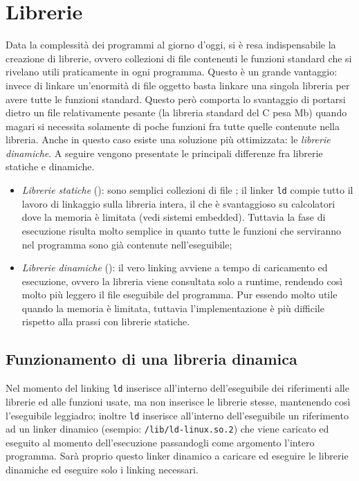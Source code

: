 \section{Librerie}
Data la complessità dei programmi al giorno d'oggi, si è resa indispensabile la creazione di librerie, ovvero collezioni di file  contenenti le funzioni standard che si rivelano utili praticamente in ogni programma.
Questo è un grande vantaggio: invece di linkare un'enormità di file oggetto basta linkare una singola libreria per avere tutte le funzioni standard. Questo però comporta lo svantaggio di portarsi dietro un file relativamente pesante (la libreria standard del C pesa \unit[2,5]{Mb}) quando magari si necessita solamente di poche funzioni fra tutte quelle contenute nella libreria. Anche in questo caso esiste una soluzione più ottimizzata: le \emph{librerie dinamiche}. A seguire vengono presentate le principali differenze fra librerie statiche e dinamiche.
\begin{itemize}
	\item \emph{Librerie statiche} (): sono semplici collezioni di file ; il linker \texttt{ld} compie tutto il lavoro di linkaggio sulla libreria intera, il che è svantaggioso su calcolatori dove la memoria è limitata (vedi sistemi embedded). Tuttavia la fase di esecuzione risulta molto semplice in quanto tutte le funzioni che serviranno nel programma sono già contenute nell'eseguibile;
	\item \emph{Librerie dinamiche} (): il vero linking avviene a tempo di caricamento ed esecuzione, ovvero la libreria viene consultata solo a runtime, rendendo così molto più leggero il file eseguibile del programma. Pur essendo molto utile quando la memoria è limitata, tuttavia l'implementazione è più difficile rispetto alla prassi con librerie statiche.
\end{itemize}

\subsection{Funzionamento di una libreria dinamica}
Nel momento del linking \texttt{ld} inserisce all'interno dell'eseguibile dei riferimenti alle librerie ed alle funzioni usate, ma non inserisce le librerie stesse, mantenendo così l'eseguibile leggiadro; inoltre \texttt{ld} inserisce all'interno dell'eseguibile un riferimento ad un linker dinamico (esempio: \texttt{/lib/ld-linux.so.2}) che viene caricato ed eseguito al momento dell'esecuzione passandogli come argomento l'intero programma. Sarà proprio questo linker dinamico a caricare ed eseguire le librerie dinamiche ed eseguire solo i linking necessari.

